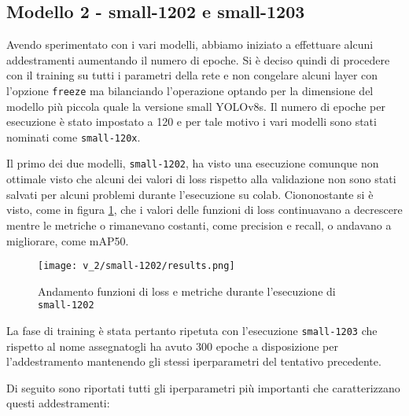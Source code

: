 \subsection*{Modello 2 - small-1202 e small-1203}

Avendo sperimentato con i vari modelli, abbiamo iniziato a effettuare alcuni addestramenti aumentando il
numero di epoche. Si è deciso quindi di procedere con il training su tutti i parametri della rete e non
congelare alcuni layer con l'opzione \verb|freeze| ma bilanciando l'operazione optando per la dimensione
del modello più piccola quale la versione small YOLOv8s. Il numero di epoche per esecuzione è stato impostato a 120 e per tale motivo i vari modelli sono stati
nominati come \verb|small-120x|. 

Il primo dei due modelli, \verb|small-1202|, ha visto una esecuzione 
comunque non ottimale visto che alcuni dei valori di loss rispetto alla validazione non sono stati 
salvati per alcuni problemi durante l'esecuzione su colab. Ciononostante si è visto, come in figura
\ref*{fig:v2-1}, che i valori delle funzioni di loss continuavano a decrescere mentre le metriche
o rimanevano costanti, come precision e recall, o andavano a migliorare, come mAP50.

\begin{figure}[h]
    \centering
    \texttt{[image: v\_2/small-1202/results.png]}
    \caption{Andamento funzioni di loss e metriche durante l'esecuzione di \texttt{small-1202}}
    \label{fig:v2-1}
\end{figure}

La fase di training è stata pertanto ripetuta con l'esecuzione \verb|small-1203| che rispetto al nome assegnatogli
ha avuto 300 epoche a disposizione per l'addestramento mantenendo gli stessi iperparametri del tentativo precedente.

Di seguito sono riportati tutti gli iperparametri più importanti che caratterizzano questi addestramenti:

